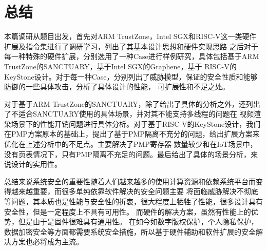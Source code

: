 \chapter{总结} %

\label{Chapter6} %
本篇调研从题目出发，首先对ARM TrustZone，Intel SGX和RISC-V这一类硬件扩展及指令集进行了调研学习，列出了其基本设计思想和硬件实现思路
之后对于每一种特殊的硬件扩展，分别选用了一种Case进行样例研究，具体包括基于ARM TrustZone的SANCTUARY，基于Intel SGX的Graphene，基于
RISC-V的KeyStone设计。对于每一种Case，分别列出了威胁模型，保证的安全性质和能够防御的一些具体攻击，分析了具体设计的性能，
可扩展性和不足之处。

对于基于ARM TrustZone的SANCTUARY，除了给出了具体的分析之外，还列出了不适合SANCTUARY使用的具体场景，并对其不能支持多线程的问题在
视频渲染场景下的性能开销问题进行具体分析。对于基于RISC-V的KeyStone设计，我们在PMP方案原本的基础上，提出了基于PMP隔离不充分的问题，给出扩展方案来优化在上述分析中的不足点。主要解决了PMP寄存器
数量较少和在IoT场景中，没有页表情况下，只有PMP隔离不充足的问题。最后给出了具体的场景分析，来说设计的实用性。

总结来说系统安全的重要性随着人们越来越多的使用计算资源和依赖系统平台而变得越来越重要，而很多单纯依靠软件解决的安全问题主要
将面临威胁解决不彻底等问题，其本质也是性能与安全性的折衷，很大程度上牺牲了性能，很多设计具有安全性，但是一定程度上不具有可用性。
而硬件的解决方案，虽然有性能上的优势，但是由于是固件很难具有通用性。
在如今如数字版权保护，个人隐私保护，数据加密安全等方面都需要系统安全措施，所以基于硬件辅助和软件扩展的安全解决方案也必将成为主流。